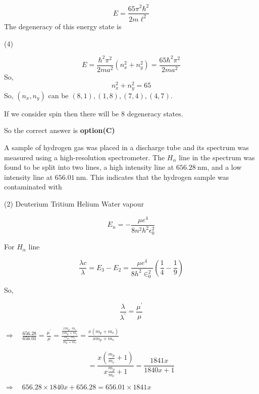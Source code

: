\begin{questions}
\begin{minipage}{\textwidth}
	$$
	E=\frac{65 \pi^{2} \hbar^{2}}{2 m \ell^{2}}
	$$
	The degeneracy of this energy state is
\end{minipage}
\begin{tasks}(4)
\end{tasks}
\begin{answer}
	$$
	E=\frac{\hbar^{2} \pi^{2}}{2 m a^{2}}\left(n_{x}^{2}+n_{y}^{2}\right)=\frac{65 \hbar^{2} \pi^{2}}{2 m a^{2}}
	$$
	So,
	$$
	n_{x}^{2}+n_{y}^{2}=65
	$$
	So, $\left(n_{x}, n_{y}\right)$ can be $(8,1),(1,8),(7,4),(4,7)$.
	
	If we consider spin then there will be 8 degeneracy states.
	
	So the correct answer is \textbf{option(C)}
\end{answer}
\begin{minipage}{\textwidth}
	\question A sample of hydrogen gas was placed in a discharge tube and its spectrum was measured using a high-resolution spectrometer. The $H_{\alpha}$ line in the spectrum was found to be split into two lines, a high intensity line at $656.28 \mathrm{~nm}$, and a low intensity line at $656.01 \mathrm{~nm}$. This indicates that the hydrogen sample was contaminated with
\end{minipage}
\begin{tasks}(2)
	\task[\textbf{A.}] Deuterium
	\task[\textbf{B.}] Tritium
	\task[\textbf{C.}] Helium
	\task[\textbf{D.}] Water vapour
\end{tasks}
\begin{answer}
		$$
	E_{n}=-\frac{\mu e^{4}}{8 n^{2} h^{2} \epsilon_{0}^{2}}
	$$
	
	For $H_{\alpha}$ line
	
	$$
	\frac{\lambda c}{\lambda}=E_{3}-E_{2}=\frac{\mu e^{4}}{8 h^{2} \in_{0}^{2}}\left(\frac{1}{4}-\frac{1}{9}\right)
	$$
	
	So,
	
	$$
	\frac{\lambda}{\lambda^{\prime}}=\frac{\mu^{\prime}}{\mu}
	$$
	
	$\Rightarrow \quad \frac{656.28}{656.01}=\frac{\mu^{\prime}}{\mu}=\frac{\frac{x m_{p} \cdot m_{e}}{x m_{p}+m_{e}}}{\frac{m_{p} \cdot m_{e}}{m_{p}+m_{e}}}=\frac{x\left(m_{p}+m_{e}\right)}{x m_{p}+m_{e}}$
	
	$$
	=\frac{x\left(\frac{m_{p}}{m_{e}}+1\right)}{x \frac{m_{p}}{m_{e}}+1}=\frac{1841 x}{1840 x+1}
	$$
	
	$\Rightarrow \quad 656.28 \times 1840 x+656.28=656.01 \times 1841 x$
	

\end{answer}
\end{questions}
